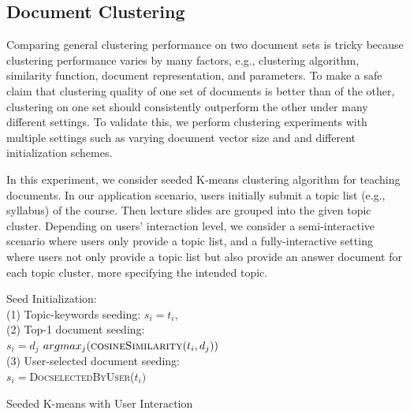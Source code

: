 \documentclass[11pt,letterpaper]{article}
\begin{document}
  
  \vspace{-2em}

\subsection{Document Clustering} 
Comparing general clustering performance on two document sets is tricky because clustering performance varies by many factors, e.g., clustering algorithm, similarity function, document representation, and parameters. To make a safe claim that clustering quality of one set of documents is better than of the other, clustering on one set should consistently outperform the other under many different settings. To validate this, we perform clustering experiments with multiple settings such as varying document vector size and and different initialization schemes. 

In this experiment, we consider seeded K-means clustering algorithm \cite{kmeans} for teaching documents. In our application scenario, users initially submit a topic list (e.g., syllabus) of the course. Then lecture slides are grouped into the given topic cluster. Depending on users' interaction level, we consider a semi-interactive scenario where users only provide a topic list, and a fully-interactive setting where users not only provide a topic list but also provide an answer document for each topic cluster, more specifying the intended topic. 

  

\begin{algorithm}[ht]
\label{seeded_kmeans}
   
 
 {Seed Initialization:}\\
 \phantom{haa}(1) Topic-keywords seeding:    $s_i = t_i$,  \\
 \phantom{haa}(2) Top-1 document seeding: \\  
 \phantom{haaa}$s_i = d_j$  $argmax_j(\textsc{cosineSimilarity}(t_i, d_j))$ \\
 \phantom{haa}(3) User-selected document seeding: \\  
 \phantom{haaa}$s_i = $\textsc{DocselectedByUser}($t_i)$  \\
 \caption{Seeded K-means with User Interaction}
\end{algorithm}
\end{document}
